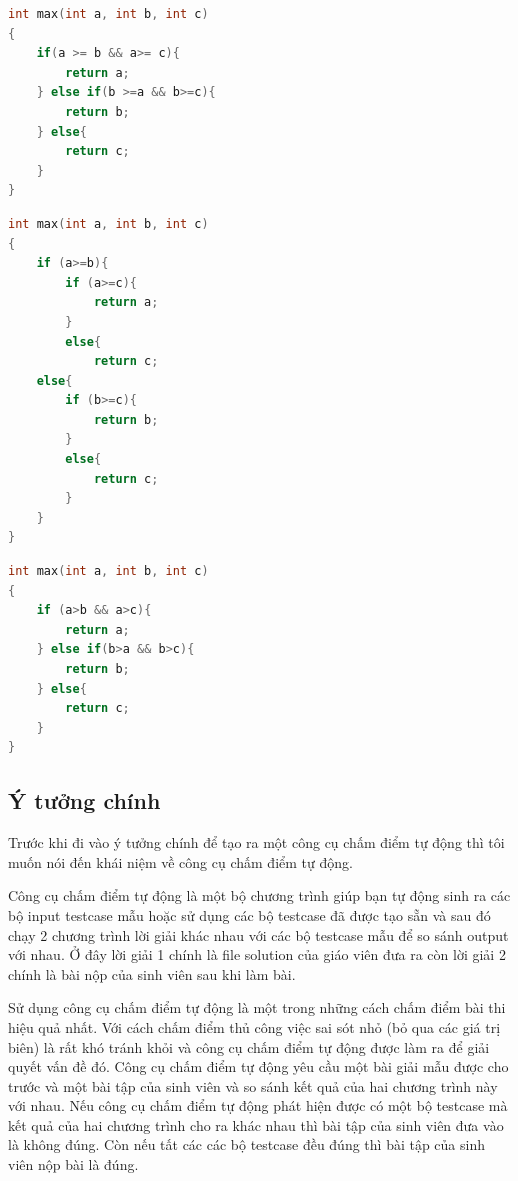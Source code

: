 \documentclass[12pt,a4paper]{article}
\begin{document}
\begin{multicols}{2}
\begin{lstlisting}[language=c]
int max(int a, int b, int c) 
{
    if(a >= b && a>= c){
        return a;
    } else if(b >=a && b>=c){
        return b;
    } else{
        return c;
    }
}
\end{lstlisting}
\caption{Hình a. Solution}
\newline \newline \newline \newline \newline \newline
\begin{lstlisting}[language=c]
int max(int a, int b, int c) 
{ 
    if (a>=b){
        if (a>=c){
            return a;
        }
        else{
            return c;
    else{
        if (b>=c){
            return b;
        }
        else{
            return c; 
        }
    }
}
\end{lstlisting}
\caption{Hình b. Sinh viên 1}
\end{multicols}
\newpage

\begin{lstlisting}[language=c]
int max(int a, int b, int c) 
{ 
    if (a>b && a>c){
        return a;
    } else if(b>a && b>c){
        return b;
    } else{
        return c;
    }
}

\end{lstlisting}
\caption{Hình c. Sinh viên 2}


\subsection{Ý tưởng chính}
Trước khi đi vào ý tưởng chính để tạo ra một công cụ chấm điểm tự động thì tôi muốn nói đến khái niệm về công cụ chấm điểm tự động.

Công cụ chấm điểm tự động là một bộ chương trình giúp bạn tự động sinh ra các bộ input testcase mẫu hoặc sử dụng các bộ testcase đã được tạo sẵn và sau đó chạy 2 chương trình lời giải khác nhau với các bộ testcase mẫu để so sánh output với nhau. Ở đây lời giải 1 chính là file solution của giáo viên đưa ra còn lời giải 2 chính là bài nộp của sinh viên sau khi làm bài.

Sử dụng công cụ chấm điểm tự động là một trong những cách chấm điểm bài thi hiệu quả nhất. Với cách chấm điểm thủ công việc sai sót nhỏ (bỏ qua các giá trị biên) là rất khó tránh khỏi và công cụ chấm điểm tự động được làm ra để giải quyết vấn đề đó. Công cụ chấm điểm tự động yêu cầu một bài giải mẫu được cho trước và một bài tập của sinh viên và so sánh kết quả của hai chương trình này với nhau. Nếu công cụ chấm điểm tự động phát hiện được có một bộ testcase mà kết quả của hai chương trình cho ra khác nhau thì bài tập của sinh viên đưa vào là không đúng. Còn nếu tất các các bộ testcase đều đúng thì bài tập của sinh viên nộp bài là đúng.
\end{document}
